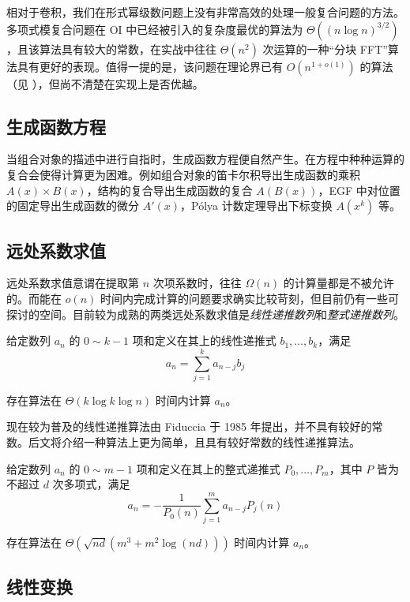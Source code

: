 相对于卷积，我们在形式幂级数问题上没有非常高效的处理一般复合问题的方法。多项式模复合问题在 OI 中已经被引入的复杂度最优的算法为 $\Theta((n\log n)^{3/2})$，且该算法具有较大的常数，在实战中往往 $\Theta(n^2)$ 次运算的一种“分块 FFT”算法具有更好的表现。值得一提的是，该问题在理论界已有 $O(n^{1+o(1)})$ 的算法（见 \cite{polyfact}），但尚不清楚在实现上是否优越。

\subsection{生成函数方程}

当组合对象的描述中进行自指时，生成函数方程便自然产生。在方程中种种运算的复合会使得计算更为困难。例如组合对象的笛卡尔积导出生成函数的乘积 $A(x)\times B(x)$，结构的复合导出生成函数的复合 $A(B(x))$，EGF 中对位置的固定导出生成函数的微分 $A'(x)$，P\'olya 计数定理导出下标变换 $A(x^k)$ 等。

\subsection{远处系数求值}

远处系数求值意谓在提取第 $n$ 次项系数时，往往 $\Omega(n)$ 的计算量都是不被允许的。而能在 $o(n)$ 时间内完成计算的问题要求确实比较苛刻，但目前仍有一些可探讨的空间。目前较为成熟的两类远处系数求值是\emph{线性递推数列}和\emph{整式递推数列}。

\begin{theorem}给定数列 $a_n$ 的 $0\sim k-1$ 项和定义在其上的线性递推式 $b_1,\dots, b_k$，满足
$$ a_n = \sum_{j=1}^k a_{n-j} b_j $$

存在算法在 $\Theta(k\log k\log n)$ 时间内计算 $a_n$。
\end{theorem}

现在较为普及的线性递推算法由 Fiduccia 于 1985 年提出，并不具有较好的常数。后文将介绍一种算法上更为简单，且具有较好常数的线性递推算法。

\begin{theorem}给定数列 $a_n$ 的 $0\sim m-1$ 项和定义在其上的整式递推式 $P_0,\dots,P_m$，其中 $P$ 皆为不超过 $d$ 次多项式，满足
$$ a_n = -\frac1{P_0(n)}\sum_{j=1}^m a_{n-j}P_j(n) $$

存在算法在 $\Theta \left(\sqrt{nd}\left(m^3+m^2\log(nd)\right)\right)$ 时间内计算 $a_n$。
\end{theorem}

\subsection{线性变换}

